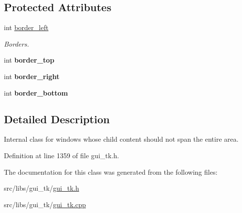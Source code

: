 \subsection*{Protected Attributes}
\begin{DoxyCompactItemize}
\item 
\hypertarget{classGUI_1_1BorderedWindow_aee7cb08a129656be54ca7c80f6a1e773}{int \hyperlink{classGUI_1_1BorderedWindow_aee7cb08a129656be54ca7c80f6a1e773}{border\-\_\-left}}\label{classGUI_1_1BorderedWindow_aee7cb08a129656be54ca7c80f6a1e773}

\begin{DoxyCompactList}\small\item\em Borders. \end{DoxyCompactList}\item 
\hypertarget{classGUI_1_1BorderedWindow_ae68c7db90609df20c166ccff4fedcbd4}{int {\bfseries border\-\_\-top}}\label{classGUI_1_1BorderedWindow_ae68c7db90609df20c166ccff4fedcbd4}

\item 
\hypertarget{classGUI_1_1BorderedWindow_a3d1e6ac0d63e78e79900129f6e6a07c3}{int {\bfseries border\-\_\-right}}\label{classGUI_1_1BorderedWindow_a3d1e6ac0d63e78e79900129f6e6a07c3}

\item 
\hypertarget{classGUI_1_1BorderedWindow_a2daa40a7c446a6753d39f5a3096546b9}{int {\bfseries border\-\_\-bottom}}\label{classGUI_1_1BorderedWindow_a2daa40a7c446a6753d39f5a3096546b9}

\end{DoxyCompactItemize}


\subsection{Detailed Description}
Internal class for windows whose child content should not span the entire area. 

Definition at line 1359 of file gui\-\_\-tk.\-h.



The documentation for this class was generated from the following files\-:\begin{DoxyCompactItemize}
\item 
src/libs/gui\-\_\-tk/\hyperlink{gui__tk_8h}{gui\-\_\-tk.\-h}\item 
src/libs/gui\-\_\-tk/\hyperlink{gui__tk_8cpp}{gui\-\_\-tk.\-cpp}\end{DoxyCompactItemize}
